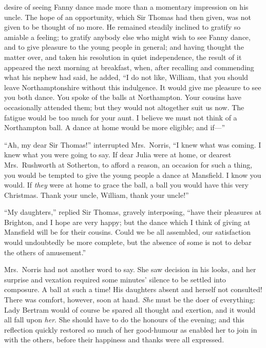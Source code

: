  desire of seeing Fanny dance made more than a
momentary impression on his uncle.  The hope of an opportunity,
which Sir Thomas had then given, was not given to be thought
of no more.  He remained steadily inclined to gratify
so amiable a feeling; to gratify anybody else who might
wish to see Fanny dance, and to give pleasure to the young
people in general; and having thought the matter over,
and taken his resolution in quiet independence,
the result of it appeared the next morning at breakfast,
when, after recalling and commending what his nephew
had said, he added, ``I do not like, William, that you
should leave Northamptonshire without this indulgence.
It would give me pleasure to see you both dance.
You spoke of the balls at Northampton.  Your cousins have
occasionally attended them; but they would not altogether
suit us now.  The fatigue would be too much for your aunt.
I believe we must not think of a Northampton ball.
A dance at home would be more eligible; and if---''

``Ah, my dear Sir Thomas!'' interrupted Mrs.\ Norris, ``I knew
what was coming.  I knew what you were going to say.  If dear
Julia were at home, or dearest Mrs.\ Rushworth at Sotherton,
to afford a reason, an occasion for such a thing, you would
be tempted to give the young people a dance at Mansfield.
I know you would.  If \emph{they} were at home to grace
the ball, a ball you would have this very Christmas.
Thank your uncle, William, thank your uncle!''

``My daughters,'' replied Sir Thomas, gravely interposing,
``have their pleasures at Brighton, and I hope are very happy;
but the dance which I think of giving at Mansfield
will be for their cousins.  Could we be all assembled,
our satisfaction would undoubtedly be more complete,
but the absence of some is not to debar the others
of amusement.''

Mrs.\ Norris had not another word to say.  She saw decision
in his looks, and her surprise and vexation required
some minutes' silence to be settled into composure.
A ball at such a time!  His daughters absent and herself
not consulted!  There was comfort, however, soon at hand.
\emph{She} must be the doer of everything:  Lady Bertram
would of course be spared all thought and exertion,
and it would all fall upon \emph{her}.  She should have to do
the honours of the evening; and this reflection quickly
restored so much of her good-humour as enabled her to join
in with the others, before their happiness and thanks were
all expressed.

